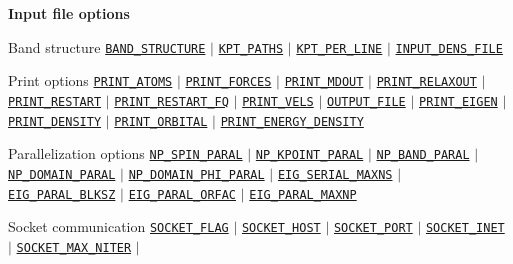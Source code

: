 \begin{frame}[allowframebreaks]{\textbf{Input file options}}
  \vspace{-2mm}
  \begin{block}{Band structure}
  \hyperlink{BAND_STRUCTURE}{\texttt{BAND\_STRUCTURE}} $\vert$
  \hyperlink{KPT_PATHS}{\texttt{KPT\_PATHS}} $\vert$
  \hyperlink{KPT_PER_LINE}{\texttt{KPT\_PER\_LINE}} $\vert$
  \hyperlink{INPUT_DENS_FILE}{\texttt{INPUT\_DENS\_FILE}}
  \end{block}
  
  \begin{block}{Print options}
  \hyperlink{PRINT_ATOMS}{\texttt{PRINT\_ATOMS}} $\vert$
  \hyperlink{PRINT_FORCES}{\texttt{PRINT\_FORCES}} $\vert$
  \hyperlink{PRINT_MDOUT}{\texttt{PRINT\_MDOUT}} $\vert$
  \hyperlink{PRINT_RELAXOUT}{\texttt{PRINT\_RELAXOUT}} $\vert$
  \hyperlink{PRINT_RESTART}{\texttt{PRINT\_RESTART}} $\vert$
  \hyperlink{PRINT_RESTART_FQ}{\texttt{PRINT\_RESTART\_FQ}} $\vert$
  \hyperlink{PRINT_VELS}{\texttt{PRINT\_VELS}} $\vert$
  \hyperlink{OUTPUT_FILE}{\texttt{OUTPUT\_FILE}} $\vert$
  \hyperlink{PRINT_EIGEN}{\texttt{PRINT\_EIGEN}} $\vert$
  \hyperlink{PRINT_DENSITY}{\texttt{PRINT\_DENSITY}} $\vert$
  \hyperlink{PRINT_ORBITAL}{\texttt{PRINT\_ORBITAL}} $\vert$
  \hyperlink{PRINT_ENERGY_DENSITY}{\texttt{PRINT\_ENERGY\_DENSITY}}
  \end{block}
  
  \begin{block}{Parallelization options}
  \hyperlink{NP_SPIN_PARAL}{\texttt{NP\_SPIN\_PARAL}} $\vert$
  \hyperlink{NP_KPOINT_PARAL}{\texttt{NP\_KPOINT\_PARAL}} $\vert$
  \hyperlink{NP_BAND_PARAL}{\texttt{NP\_BAND\_PARAL}} $\vert$
  \hyperlink{NP_DOMAIN_PARAL}{\texttt{NP\_DOMAIN\_PARAL}} $\vert$
  \hyperlink{NP_DOMAIN_PHI_PARAL}{\texttt{NP\_DOMAIN\_PHI\_PARAL}} $\vert$
  \hyperlink{EIG_SERIAL_MAXNS}{\texttt{EIG\_SERIAL\_MAXNS}} $\vert$
  \hyperlink{EIG_PARAL_BLKSZ}{\texttt{EIG\_PARAL\_BLKSZ}} $\vert$
  \hyperlink{EIG_PARAL_ORFAC}{\texttt{EIG\_PARAL\_ORFAC}} $\vert$
  \hyperlink{EIG_PARAL_MAXNP}{\texttt{EIG\_PARAL\_MAXNP}}
  \end{block}

  \begin{block}{Socket communication}
  \hyperlink{SOCKET_FLAG}{\texttt{SOCKET\_FLAG}} $\vert$
  \hyperlink{SOCKET_HOST}{\texttt{SOCKET\_HOST}} $\vert$
  \hyperlink{SOCKET_PORT}{\texttt{SOCKET\_PORT}} $\vert$
  \hyperlink{SOCKET_INET}{\texttt{SOCKET\_INET}} $\vert$
  \hyperlink{SOCKET_MAX_NITER}{\texttt{SOCKET\_MAX\_NITER}} $\vert$
  \end{block}

  \end{frame}
  
